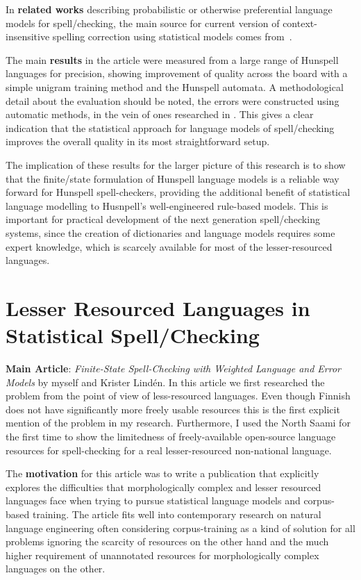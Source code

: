 \documentclass[officiallayout]{unihelcompling}
\begin{document}
In \textbf{related works} describing probabilistic or otherwise preferential
language models for spell\-/checking, the main source for current version of 
context-insensitive spelling correction using statistical models comes
from~\citet{church1991probability}.

The main \textbf{results} in the article were measured from a large range of
Hunspell languages for precision, showing improvement of quality across the
board with a simple unigram training method and the Hunspell automata. A
methodological detail about the evaluation should be noted, the errors were
constructed using automatic methods, in the vein of ones researched in
\citep{bigert2003autoeval,bigert2005automatic}. This gives a clear indication
that the statistical approach for language models of spell\-/checking improves
the overall quality in its most straightforward setup.

The implication of these results for the larger picture of this research is to
show that the finite\-/state formulation of Hunspell language models is a
reliable way forward for Hunspell spell-checkers, providing the additional
benefit of statistical language modelling to Husnpell's well-engineered
rule-based models. This is important for practical development of the next
generation spell\-/checking systems, since the creation of dictionaries and
language models requires some expert knowledge, which is scarcely available for
most of the lesser-resourced languages.

\section{Lesser Resourced Languages in Statistical Spell\-/Checking}
\label{sec:lesser-training}

\textbf{Main Article}: \emph{Finite-State Spell-Checking with Weighted Language
and Error Models} by myself and Krister Lindén. In this article we first
researched the problem from the point of view of less-resourced languages. Even
though Finnish does not have significantly more freely usable resources this is
the first explicit mention of the problem in my research. Furthermore, I used
the North Saami for the first time to show the limitedness of freely-available
open-source language resources for spell-checking for a real lesser-resourced
non-national language.

The \textbf{motivation} for this article was to write a publication that
explicitly explores the difficulties that morphologically complex and lesser
resourced languages face when trying to pursue statistical language models and
corpus-based training. The article fits well into contemporary research on
natural language engineering often considering corpus-training as a kind of
solution for all problems ignoring the scarcity of resources on the other hand
and the much higher requirement of unannotated resources for morphologically
complex languages on the other.
\end{document}
